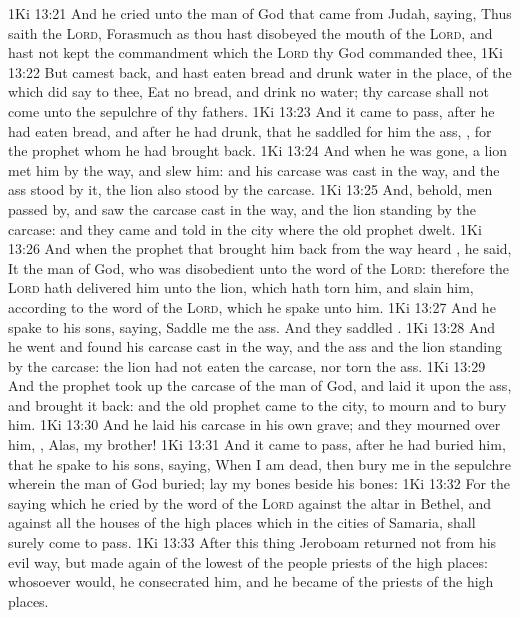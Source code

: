 \vs 1Ki 13:21 And he cried unto the man of God that came from Judah, saying, Thus saith the \textsc{Lord}, Forasmuch as thou hast disobeyed the mouth of the \textsc{Lord}, and hast not kept the commandment which the \textsc{Lord} thy God commanded thee,
\vs 1Ki 13:22 But camest back, and hast eaten bread and drunk water in the place, of the which  did say to thee, Eat no bread, and drink no water; thy carcase shall not come unto the sepulchre of thy fathers.
\vs 1Ki 13:23 And it came to pass, after he had eaten bread, and after he had drunk, that he saddled for him the ass, , for the prophet whom he had brought back.
\vs 1Ki 13:24 And when he was gone, a lion met him by the way, and slew him: and his carcase was cast in the way, and the ass stood by it, the lion also stood by the carcase.
\vs 1Ki 13:25 And, behold, men passed by, and saw the carcase cast in the way, and the lion standing by the carcase: and they came and told  in the city where the old prophet dwelt.
\vs 1Ki 13:26 And when the prophet that brought him back from the way heard , he said, It  the man of God, who was disobedient unto the word of the \textsc{Lord}: therefore the \textsc{Lord} hath delivered him unto the lion, which hath torn him, and slain him, according to the word of the \textsc{Lord}, which he spake unto him.
\vs 1Ki 13:27 And he spake to his sons, saying, Saddle me the ass. And they saddled .
\vs 1Ki 13:28 And he went and found his carcase cast in the way, and the ass and the lion standing by the carcase: the lion had not eaten the carcase, nor torn the ass.
\vs 1Ki 13:29 And the prophet took up the carcase of the man of God, and laid it upon the ass, and brought it back: and the old prophet came to the city, to mourn and to bury him.
\vs 1Ki 13:30 And he laid his carcase in his own grave; and they mourned over him, , Alas, my brother!
\vs 1Ki 13:31 And it came to pass, after he had buried him, that he spake to his sons, saying, When I am dead, then bury me in the sepulchre wherein the man of God  buried; lay my bones beside his bones:
\vs 1Ki 13:32 For the saying which he cried by the word of the \textsc{Lord} against the altar in Bethel, and against all the houses of the high places which  in the cities of Samaria, shall surely come to pass.
\vs 1Ki 13:33 After this thing Jeroboam returned not from his evil way, but made again of the lowest of the people priests of the high places: whosoever would, he consecrated him, and he became  of the priests of the high places.

